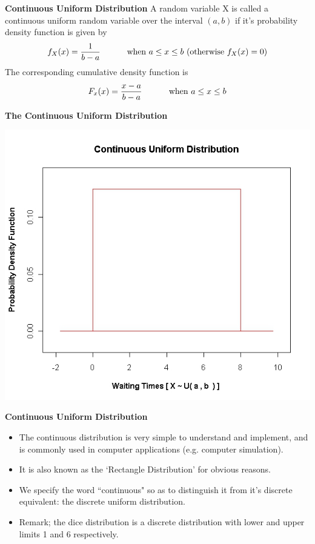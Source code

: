 

{
\textbf{Continuous Uniform Distribution}
A random variable X is called a continuous uniform random variable over the interval $(a,b)$ if it's probability density function is given by
\[ f_{X}(x) = { 1 \over b-a} \hspace{1cm} \mbox{ when } a \leq x \leq b \mbox{     (otherwise } f_X(x) = 0 ) \]
The corresponding cumulative density function is
\[ F_x(x) = { x-a \over b-a} \hspace{1cm} \mbox{ when } a \leq x \leq b\]
}

\textbf{The Continuous Uniform Distribution}



\begin{center}
\includegraphics[scale=0.35]{6AUniform}

\end{center}
\medskip
{
\textbf{Continuous Uniform Distribution}
\begin{itemize}
\item The continuous distribution is very simple to understand and implement, and is commonly used in computer applications (e.g. computer simulation).
\item It is also known as the `Rectangle Distribution' for obvious reasons.
\item We specify the word ``continuous" so as to distinguish it from it's discrete equivalent: the discrete uniform distribution.
\item Remark; the dice distribution is a discrete distribution with lower and upper limits 1 and 6 respectively.
\end{itemize}
}

